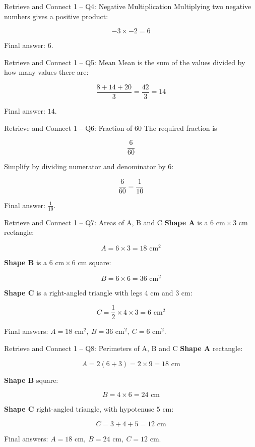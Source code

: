 \documentclass{beamer}
\begin{document}
\begin{frame}{Retrieve and Connect 1 -- Q4: Negative Multiplication}
\small
Multiplying two negative numbers gives a positive product:

\[
-3 \times -2 = 6
\]

Final answer: \(\boxed{6}\).
\end{frame}

\begin{frame}{Retrieve and Connect 1 -- Q5: Mean}
\small
Mean is the sum of the values divided by how many values there are:

\[
\frac{8+14+20}{3}=\frac{42}{3}=14
\]

Final answer: \(\boxed{14}\).
\end{frame}

\begin{frame}{Retrieve and Connect 1 -- Q6: Fraction of 60}
\small
The required fraction is

\[
\frac{6}{60}
\]

Simplify by dividing numerator and denominator by 6:

\[
\frac{6}{60}=\frac{1}{10}
\]

Final answer: \(\boxed{\frac{1}{10}}\).
\end{frame}

\begin{frame}{Retrieve and Connect 1 -- Q7: Areas of A, B and C}
\small
\textbf{Shape A} is a \(6\text{ cm}\times 3\text{ cm}\) rectangle:

\[
A=6\times 3=18\text{ cm}^2
\]

\textbf{Shape B} is a \(6\text{ cm}\times 6\text{ cm}\) square:

\[
B=6\times 6=36\text{ cm}^2
\]

\textbf{Shape C} is a right-angled triangle with legs \(4\text{ cm}\) and \(3\text{ cm}\):

\[
C=\frac12 \times 4 \times 3=6\text{ cm}^2
\]

Final answers: \(\boxed{A=18\text{ cm}^2,\ B=36\text{ cm}^2,\ C=6\text{ cm}^2}\).
\end{frame}

\begin{frame}{Retrieve and Connect 1 -- Q8: Perimeters of A, B and C}
\small
\textbf{Shape A} rectangle:

\[
A=2(6+3)=2\times 9=18\text{ cm}
\]

\textbf{Shape B} square:

\[
B=4\times 6=24\text{ cm}
\]

\textbf{Shape C} right-angled triangle, with hypotenuse \(5\text{ cm}\):

\[
C=3+4+5=12\text{ cm}
\]

Final answers: \(\boxed{A=18\text{ cm},\ B=24\text{ cm},\ C=12\text{ cm}}\).
\end{frame}
\end{document}
